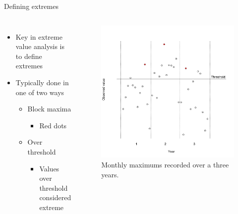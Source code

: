 \documentclass{beamer}
\begin{document}
\begin{frame}{Defining extremes}
\begin{columns}[c]
  \begin{itemize} \setlength{\itemsep}{0.5em}
    \item Key in extreme value analysis is to define extremes
    \item Typically done in one of two ways
    \begin{itemize}
      \item Block maxima
      \begin{itemize}
        \item Red dots
      \end{itemize}
      \item Over threshold
      \begin{itemize}
        \item Values over threshold considered extreme
      \end{itemize}
    \end{itemize}
  \end{itemize}

  \begin{figure}
    \includegraphics[width=1\linewidth]{./plots/define_extreme.pdf}
    \caption{Monthly maximums recorded over a three years.}
    \end{figure}
\end{columns}
\end{frame}
\end{document}
